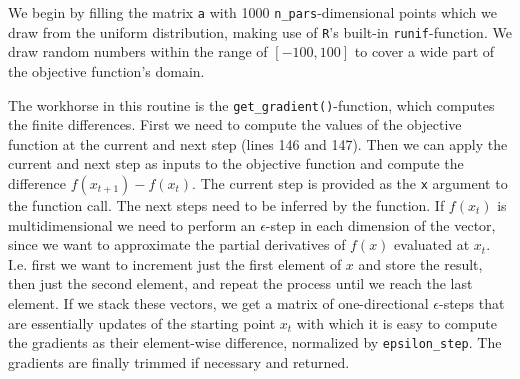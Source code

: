 \documentclass{article}
\begin{document}


We begin by filling the matrix \texttt{a} with 1000 \texttt{n\_pars}-dimensional points which we draw from the uniform distribution, making use of \texttt{R}'s built-in \texttt{runif}-function. We draw random numbers within the range of $[-100, 100]$ to cover a wide part of the objective function's domain.  

The workhorse in this routine is the \texttt{get\_gradient()}-function, which computes the finite differences. First we need to compute the values of the objective function at the current and next step (lines 146 and 147). Then we can apply the current and next step as inputs to the objective function and compute the difference $f(x_{t+1}) - f(x_t)$. The current step is provided as the \texttt{x} argument to the function call. The next steps need to be inferred by the function. If $f(x_t)$ is multidimensional we need to perform an $\epsilon$-step in each dimension of the vector, since we want to approximate the partial derivatives of $f(x)$ evaluated at $x_t$. I.e. first we want to increment just the first element of $x$ and store the result, then just the second element, and repeat the process until we reach the last element. If we stack these vectors, we get a matrix of one-directional $\epsilon$-steps that are essentially updates of the starting point $x_t$ with which it is easy to compute the gradients as their element-wise difference, normalized by \texttt{epsilon\_step}. The gradients are finally trimmed if necessary and returned.


\end{document}
